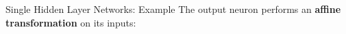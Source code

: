 \begin{frame} {Single Hidden Layer Networks: Example}
The output neuron performs an \textbf{affine transformation} on its inputs:
\begin{figure}
\centering
{}
\end{figure}
\end{frame}


